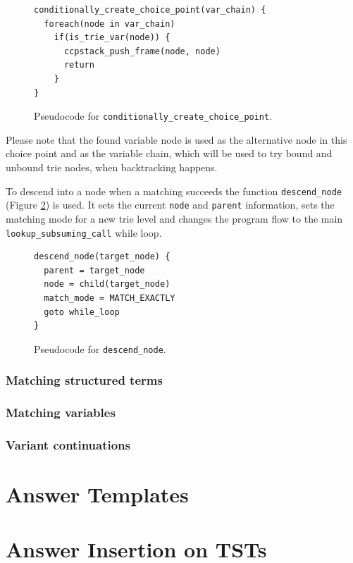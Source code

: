\begin{figure}[ht]
\begin{verbatim}
conditionally_create_choice_point(var_chain) {
  foreach(node in var_chain)
    if(is_trie_var(node)) {
      ccpstack_push_frame(node, node)
      return
    }
}
\end{verbatim}
\caption{Pseudo\-code for \texttt{conditionally\_create\_choice\_point}.}
\label{fig:conditionally_create_choice_point}
\end{figure}

Please note that the found variable node is used as the alternative node in this choice point
and as the variable chain, which will be used to try bound and unbound trie nodes, when backtracking happens.

To descend into a node when a matching succeeds the function \texttt{descend\_node} (Figure \ref{fig:descend_node})
is used. It sets the current \texttt{node} and \texttt{parent} information, sets the matching mode for a new trie level
and changes the program flow to the main \texttt{lookup\_subsuming\_call} while loop.

\begin{figure}[ht]
\begin{verbatim}
descend_node(target_node) {
  parent = target_node
  node = child(target_node)
  match_mode = MATCH_EXACTLY
  goto while_loop
}
\end{verbatim}
\caption{Pseudo\-code for \texttt{descend\_node}.}
\label{fig:descend_node}
\end{figure}


\subsubsection{Matching structured terms}

\subsubsection{Matching variables}

\subsubsection{Variant continuations}

\section{Answer Templates}

\section{Answer Insertion on TSTs}

